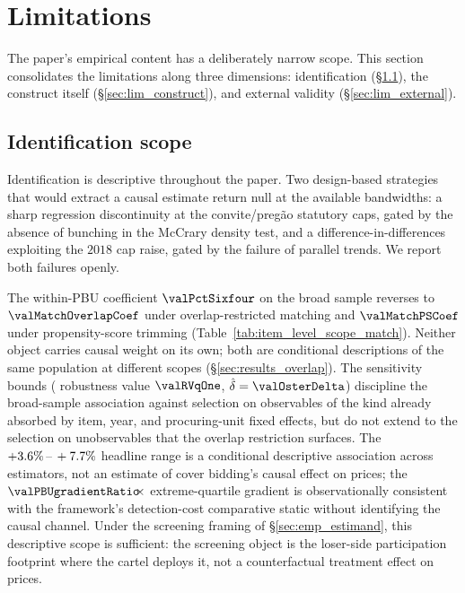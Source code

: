 \section{Limitations}
\label{sec:limitations}

The paper's empirical content has a deliberately narrow scope.
This section consolidates the limitations along three dimensions:
identification (§\ref{sec:lim_identification}), the construct
itself (§\ref{sec:lim_construct}), and external validity
(§\ref{sec:lim_external}).

\subsection{Identification scope}
\label{sec:lim_identification}

Identification is descriptive throughout the paper. Two
design-based strategies that would extract a causal estimate
return null at the available bandwidths: a sharp regression
discontinuity at the convite/preg\~ao statutory caps, gated by
the absence of bunching in the McCrary density test, and a
difference-in-differences exploiting the $2018$ cap raise,
gated by the failure of parallel trends. We report both
failures openly.

The within-PBU coefficient $\valPctSixfour$ on the broad sample
reverses to $\valMatchOverlapCoef$ under overlap-restricted
matching and $\valMatchPSCoef$ under propensity-score trimming
(Table~\ref{tab:item_level_scope_match}). Neither object
carries causal weight on its own; both are conditional
descriptions of the same population at different scopes
(§\ref{sec:results_overlap}). The sensitivity bounds
(\citet{cinelli2020making} robustness value $\valRVqOne$,
\citet{oster2019unobservable} $\hat\delta = \valOsterDelta$)
discipline the broad-sample association against selection on
observables of the kind already absorbed by item, year, and
procuring-unit fixed effects, but do not extend to the
selection on unobservables that the overlap restriction
surfaces. The $+3.6\%\,\text{--}\,+7.7\%$ headline range is a
conditional descriptive association across estimators, not an
estimate of cover bidding's causal effect on prices; the
$\valPBUgradientRatio\!\!\times$ extreme-quartile gradient is
observationally consistent with the framework's
detection-cost comparative static without identifying the
causal channel. Under the screening framing of
§\ref{sec:emp_estimand}, this descriptive scope is sufficient:
the screening object is the loser-side participation footprint
where the cartel deploys it, not a counterfactual treatment
effect on prices.

